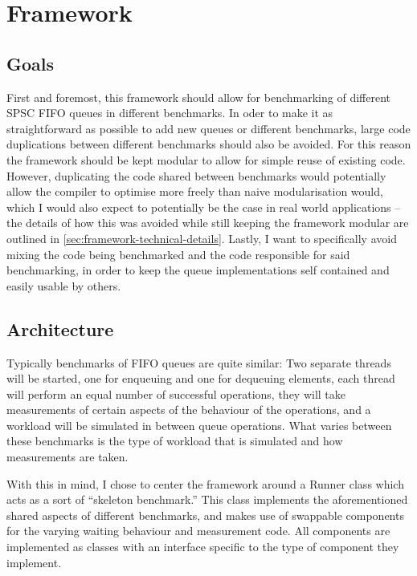 \section{Framework}
\label{sec:framework}
\subsection{Goals}
First and foremost, this framework should allow for benchmarking of different SPSC FIFO queues in different benchmarks.
In oder to make it as straightforward as possible to add new queues or different benchmarks, large code
duplications between different benchmarks should also be avoided.
For this reason the framework should be kept modular to allow for simple reuse of existing code.
However, duplicating the code shared between benchmarks would potentially allow the compiler to optimise more
freely than naive modularisation would, which I would also expect to potentially be the case in real world
applications -- the details of how this was avoided while still keeping the framework modular are outlined in
\autoref{sec:framework-technical-details}.
Lastly, I want to specifically avoid mixing the code being benchmarked and the code responsible for said
benchmarking, in order to keep the queue implementations self contained and easily usable by others.

\subsection{Architecture}
Typically benchmarks of FIFO queues are quite similar\cite{EQueue,B-Queue,MCRingBuffer}:
Two separate threads will be started, one for enqueuing and one for dequeuing elements,
each thread will perform an equal number of successful operations,
they will take measurements of certain aspects of the behaviour of the operations,
and a workload will be simulated in between queue operations.
What varies between these benchmarks is the type of workload that is simulated and how measurements are taken.

With this in mind, I chose to center the framework around a Runner class which acts as a sort of ``skeleton benchmark.''
This class implements the aforementioned shared aspects of different benchmarks, and makes use of swappable
components for the varying waiting behaviour and measurement code.
All components are implemented as classes with an interface specific to the type of component they implement.

